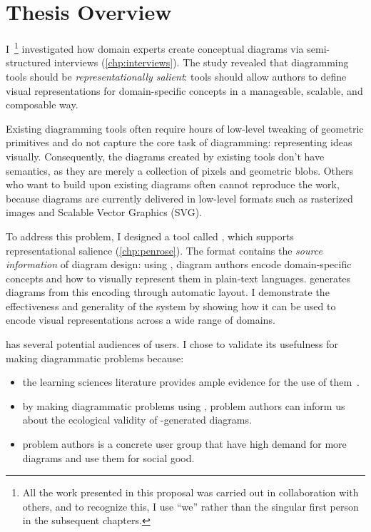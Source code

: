 \section{Thesis Overview}

I~\footnote{All the work presented in this proposal was carried out in collaboration with others, and to recognize this, I use ``we'' rather than the singular first person in the subsequent chapters.} investigated how domain experts create conceptual diagrams via semi-structured interviews (\cref{chp:interviews}). The study revealed that diagramming tools should be \textit{representationally salient}: tools should allow authors to define visual representations for domain-specific concepts in a manageable, scalable, and composable way. 

Existing diagramming tools often require hours of low-level tweaking of geometric primitives and do not capture the core task of diagramming: representing ideas visually. Consequently, the diagrams created by existing tools don't have semantics, as they are merely a collection of pixels and geometric blobs. Others who want to build upon existing diagrams often cannot reproduce the work, because diagrams are currently delivered in low-level formats such as rasterized images and Scalable Vector Graphics (SVG). 

To address this problem, I designed a tool called \Penrose, which supports representational salience (\cref{chp:penrose}). The \Penrose format contains the \emph{source information} of diagram design: using \Penrose, diagram authors encode domain-specific concepts and how to visually represent them in plain-text languages. \Penrose generates diagrams from this encoding through automatic layout. I demonstrate the effectiveness and generality of the system by showing how it can be used to encode visual representations across a wide range of domains.

\Penrose has several potential audiences of users. I chose to validate its usefulness for making diagrammatic problems because:

\begin{itemize}
    \item the learning sciences literature provides ample evidence for the use of them~\cite{multipleReps, mayer_multimedia_2002, blum_combining_1998}.
    \item by making diagrammatic problems using \Penrose, problem authors can inform us about the ecological validity of \Penrose-generated diagrams.
    \item problem authors is a concrete user group that have high demand for more diagrams and use them for social good.
\end{itemize}

